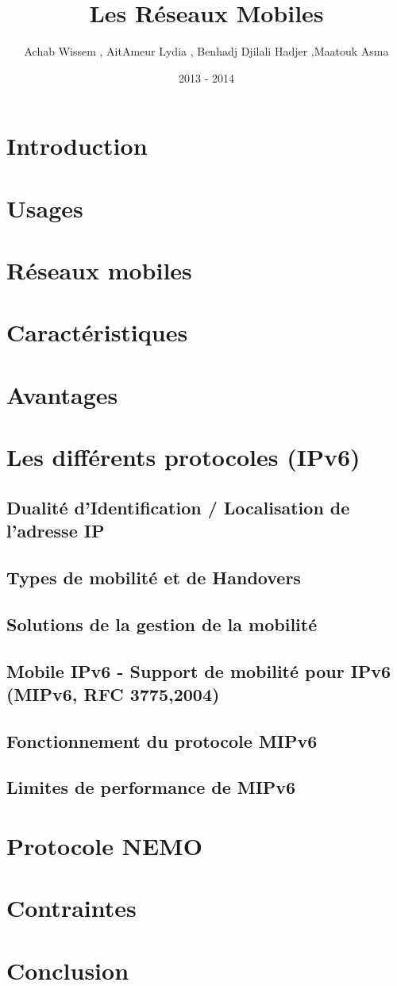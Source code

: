 \documentclass[a4paper]{article}
\title{Les R\'{e}seaux Mobiles}
\author{Achab Wissem , AitAmeur Lydia , Benhadj Djilali Hadjer ,Maatouk Asma}
\date{2013 - 2014}
\begin{document}
\maketitle
\newpage 
\renewcommand{\contentsname}{Sommaire}
\tableofcontents


\section{Introduction}
\section{Usages}
\section{R\'{e}seaux mobiles}
\section{Caract\'{e}ristiques}
\section{Avantages}
\section{Les diff\'{e}rents protocoles (IPv6)}
\subsection{Dualit\'{e} d'Identification / Localisation de l'adresse IP}
\subsection{Types de mobilit\'{e} et de Handovers}
\subsection{Solutions de la gestion de la mobilit\'{e}}
\subsection{Mobile IPv6 - Support de mobilit\'{e} pour IPv6 (MIPv6, RFC 3775,2004)}
\subsection{Fonctionnement du protocole MIPv6}
\subsection{Limites de performance de MIPv6 }
\section{Protocole NEMO}
\section{Contraintes}
\section{Conclusion}
\end{document}
